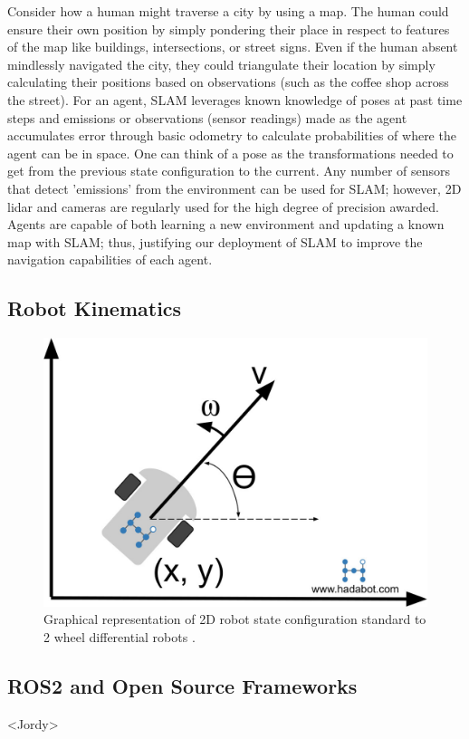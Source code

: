 \documentclass[conference]{IEEEtran}
\begin{document}
Consider how a human might traverse a city by using a map. The human could ensure their own position by simply pondering their place in respect to features of the map like buildings, intersections, or street signs. Even if the human absent mindlessly navigated the city, they could triangulate their location by simply calculating their positions based on observations (such as the coffee shop across the street). For an agent, SLAM leverages known knowledge of poses at past time steps and emissions or observations (sensor readings) made as the agent accumulates error through basic odometry to calculate probabilities of where the agent can be in space. One can think of a pose as the transformations needed to get from the previous state configuration to the current. Any number of sensors that detect 'emissions' from the environment can be used for SLAM; however, 2D lidar and cameras are regularly used for the high degree of precision awarded. Agents are capable of both learning a new environment and updating a known map with SLAM; thus, justifying our deployment of SLAM to improve the navigation capabilities of each agent.

\subsection{Robot Kinematics}
\begin{figure}
	\includegraphics[width=\linewidth]{hadabot_unicycle_diagram_01.jpg}
	\caption{Graphical representation of 2D robot state configuration standard to 2 wheel differential robots \cite{RN109}.}
\end{figure}

\subsection{ROS2 and Open Source Frameworks} <Jordy>
\end{document}
